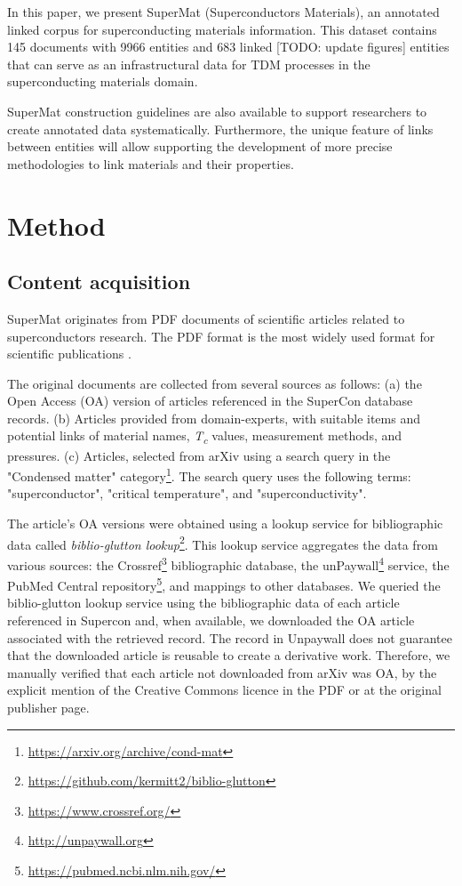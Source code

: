 \documentclass[fleqn,10pt]{wlscirep}
\begin{document}
In this paper, we present SuperMat (Superconductors Materials), an annotated linked corpus for superconducting materials information. 
This dataset contains 145 documents with 9966 entities and 683 linked [TODO: update figures] entities that can serve as an infrastructural data for TDM processes in the superconducting materials domain. 

SuperMat  construction guidelines are also available to support  researchers to create annotated data systematically.
Furthermore, the unique feature of links between entities will allow supporting the development of more precise methodologies to link materials and their properties.

\label{sec:method}
\section*{Method}

\label{content-acquisition}
\subsection*{Content acquisition}
SuperMat originates from PDF documents of scientific articles related to superconductors research. 
The PDF format is the most widely used format for scientific publications \cite{johnson2018pdfStatistics}.

The original documents are collected from several sources as follows: (a) the Open Access (OA) version of articles referenced in the SuperCon database records. 
(b) Articles provided from domain-experts, with suitable items and potential links of material names, \textit{T\textsubscript{c}} values, measurement methods, and pressures.  
(c) Articles, selected from arXiv using a search query in the "Condensed matter" category\footnote{\url{https://arxiv.org/archive/cond-mat}}. The search query uses the following terms: "superconductor", "critical temperature", and "superconductivity". 

The article's OA versions were obtained using a lookup service for bibliographic data called \textit{biblio-glutton lookup}\footnote{\url{https://github.com/kermitt2/biblio-glutton}}. This lookup service aggregates the data from various sources: the Crossref\footnote{\url{https://www.crossref.org/}} bibliographic database, the unPaywall\footnote{\url{http://unpaywall.org}} service, the PubMed Central repository\footnote{\url{https://pubmed.ncbi.nlm.nih.gov/}}, and mappings to other databases. 
We queried the biblio-glutton lookup service using the bibliographic data of each article referenced in Supercon and, when available, we downloaded the OA article associated with the retrieved record. 
The record in Unpaywall does not guarantee that the downloaded article is reusable to create a derivative work. Therefore, we manually verified that each article not downloaded from arXiv was OA, by the explicit mention of the Creative Commons licence in the PDF or at the original publisher page. 
\end{document}
